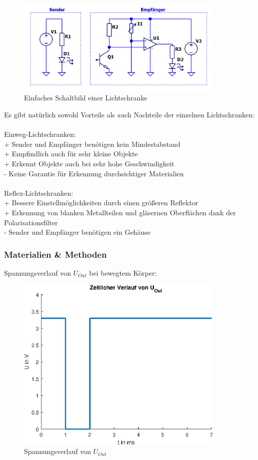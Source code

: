 \begin{figure}[htb]
    \includegraphics[width=10cm]{./res/Recherche}
    \caption{Einfaches Schaltbild einer Lichtschranke}
    \label{fig:LichtschrankeEinfach}
\end{figure}

\noindent
Es gibt natürlich sowohl Vorteile als auch Nachteile der einzelnen Lichtschranken:\\
\\
Einweg-Lichtschranken:\\
+ Sender und Empfänger benötigen kein Mindestabstand\\
+ Empfindlich auch für sehr kleine Objekte\\
+ Erkennt Objekte auch bei sehr hohe Geschwindigkeit\\
- Keine Garantie für Erkennung durchsichtiger Materialien\\
\\
Reflex-Lichtschranken:\\
+ Bessere Einstellmöglichkeiten durch einen größeren Reflektor\\
+ Erkennung von blanken Metallteilen und gläsernen Oberflächen dank der Polarisationsfilter\\
- Sender und Empfänger benötigen ein Gehäuse \cite{funktionsweise} \\

\clearpage
\subsubsection{Materialien \& Methoden}

Spannungsverlauf von $U_{Out}$ bei bewegtem Körper:

\begin{figure}[htb]
    \includegraphics[width=10cm]{./res/Lichtschranke_Spannungsverlauf}
    \caption{Spannungsverlauf von $U_{Out}$}
    \label{fig:SpannungsverlaufUout}
\end{figure}

